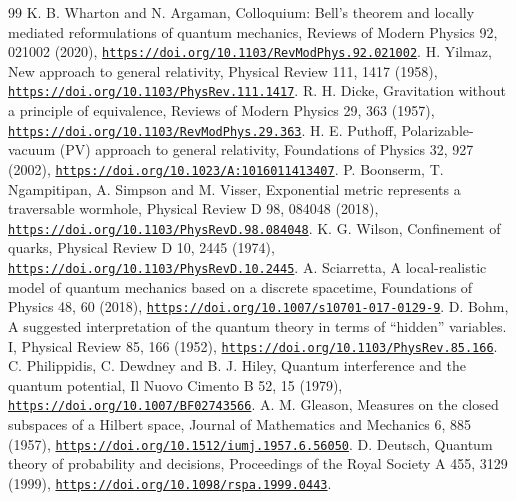 \documentclass[pdflatex,sn-mathphys-num]{sn-jnl}
\theoremstyle{thmstyleone}
\begin{document}
\begin{thebibliography}{99}
 K. B. Wharton and N. Argaman, Colloquium: Bell's theorem and locally mediated reformulations of quantum mechanics, Reviews of Modern Physics 92, 021002 (2020), \href{https://doi.org/10.1103/RevModPhys.92.021002}{\nolinkurl{https://doi.org/10.1103/RevModPhys.92.021002}}.
 H. Yilmaz, New approach to general relativity, Physical Review 111, 1417 (1958), \href{https://doi.org/10.1103/PhysRev.111.1417}{\nolinkurl{https://doi.org/10.1103/PhysRev.111.1417}}.
 R. H. Dicke, Gravitation without a principle of equivalence, Reviews of Modern Physics 29, 363 (1957), \href{https://doi.org/10.1103/RevModPhys.29.363}{\nolinkurl{https://doi.org/10.1103/RevModPhys.29.363}}.
 H. E. Puthoff, Polarizable-vacuum (PV) approach to general relativity, Foundations of Physics 32, 927 (2002), \href{https://doi.org/10.1023/A:1016011413407}{\nolinkurl{https://doi.org/10.1023/A:1016011413407}}.
 P. Boonserm, T. Ngampitipan, A. Simpson and M. Visser, Exponential metric represents a traversable wormhole, Physical Review D 98, 084048 (2018), \href{https://doi.org/10.1103/PhysRevD.98.084048}{\nolinkurl{https://doi.org/10.1103/PhysRevD.98.084048}}.
 K. G. Wilson, Confinement of quarks, Physical Review D 10, 2445 (1974), \href{https://doi.org/10.1103/PhysRevD.10.2445}{\nolinkurl{https://doi.org/10.1103/PhysRevD.10.2445}}.
 A. Sciarretta, A local-realistic model of quantum mechanics based on a discrete spacetime, Foundations of Physics 48, 60 (2018), \href{https://doi.org/10.1007/s10701-017-0129-9}{\nolinkurl{https://doi.org/10.1007/s10701-017-0129-9}}.
 D. Bohm, A suggested interpretation of the quantum theory in terms of ``hidden'' variables. I, Physical Review 85, 166 (1952), \href{https://doi.org/10.1103/PhysRev.85.166}{\nolinkurl{https://doi.org/10.1103/PhysRev.85.166}}.
 C. Philippidis, C. Dewdney and B. J. Hiley, Quantum interference and the quantum potential, Il Nuovo Cimento B 52, 15 (1979), \href{https://doi.org/10.1007/BF02743566}{\nolinkurl{https://doi.org/10.1007/BF02743566}}.
 A. M. Gleason, Measures on the closed subspaces of a Hilbert space, Journal of Mathematics and Mechanics 6, 885 (1957), \href{https://doi.org/10.1512/iumj.1957.6.56050}{\nolinkurl{https://doi.org/10.1512/iumj.1957.6.56050}}.
 D. Deutsch, Quantum theory of probability and decisions, Proceedings of the Royal Society A 455, 3129 (1999), \href{https://doi.org/10.1098/rspa.1999.0443}{\nolinkurl{https://doi.org/10.1098/rspa.1999.0443}}.

\end{thebibliography}
\end{document}
